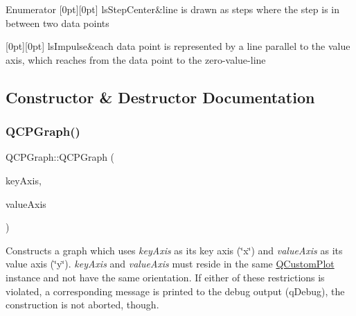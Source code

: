 \begin{DoxyEnumFields}{Enumerator}
[0pt][0pt]{}\mbox{\label{class_q_c_p_graph_ad60175cd9b5cac937c5ee685c32c0859a5adf7b04da215a40a764c21294ea7366}} 
ls\+Step\+Center&line is drawn as steps where the step is in between two data points \\
\hline

[0pt][0pt]{}\mbox{\label{class_q_c_p_graph_ad60175cd9b5cac937c5ee685c32c0859aa3b358b4ae7cca94aceeb8e529c12ebb}} 
ls\+Impulse&each data point is represented by a line parallel to the value axis, which reaches from the data point to the zero-\/value-\/line \\
\hline

\end{DoxyEnumFields}


\subsection{Constructor \& Destructor Documentation}
\mbox{\label{class_q_c_p_graph_a0393a38cf7183cbf46348eb6cf9a5a6c}} 
\subsubsection{\texorpdfstring{QCPGraph()}{QCPGraph()}}
{\footnotesize\ttfamily Q\+C\+P\+Graph\+::\+Q\+C\+P\+Graph (\begin{DoxyParamCaption}\item[{\mbox{\hyperlink{class_q_c_p_axis}{Q\+C\+P\+Axis}} $\ast$}]{key\+Axis,  }\item[{\mbox{\hyperlink{class_q_c_p_axis}{Q\+C\+P\+Axis}} $\ast$}]{value\+Axis }\end{DoxyParamCaption})\hspace{0.3cm}{\ttfamily [explicit]}}

Constructs a graph which uses {\itshape key\+Axis} as its key axis (\char`\"{}x\char`\"{}) and {\itshape value\+Axis} as its value axis (\char`\"{}y\char`\"{}). {\itshape key\+Axis} and {\itshape value\+Axis} must reside in the same \mbox{\hyperlink{class_q_custom_plot}{Q\+Custom\+Plot}} instance and not have the same orientation. If either of these restrictions is violated, a corresponding message is printed to the debug output (q\+Debug), the construction is not aborted, though.

